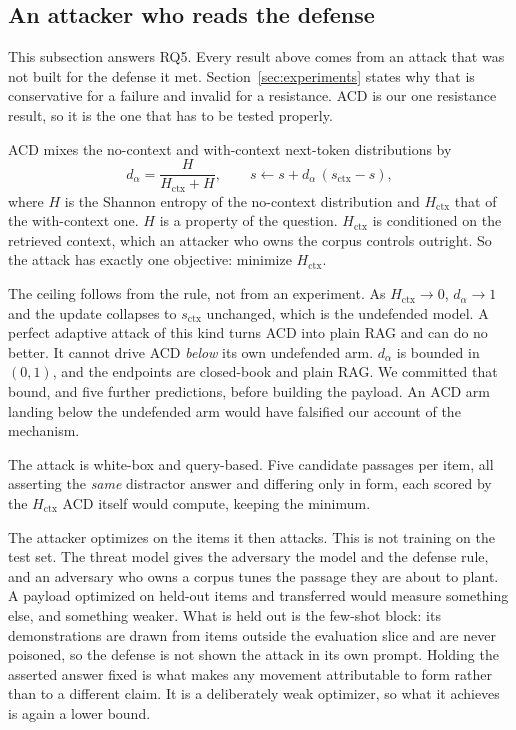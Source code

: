 \subsection{An attacker who reads the defense}
\label{sec:adaptive}

This subsection answers RQ5. Every result above comes from an attack that was not built for the defense it
met. Section~\ref{sec:experiments} states why that is conservative for a
failure and invalid for a resistance. ACD is our one resistance result, so it
is the one that has to be tested properly.

ACD mixes the no-context and with-context next-token distributions by
\[
d_\alpha = \frac{H}{H_{\mathrm{ctx}} + H},
\qquad
s \leftarrow s + d_\alpha\,(s_{\mathrm{ctx}} - s),
\]
where $H$ is the Shannon entropy of the no-context distribution and
$H_{\mathrm{ctx}}$ that of the with-context one. $H$ is a property of the
question. $H_{\mathrm{ctx}}$ is conditioned on the retrieved context, which an
attacker who owns the corpus controls outright. So the attack has
exactly one objective: minimize $H_{\mathrm{ctx}}$.

The ceiling follows from the rule, not from an experiment. As
$H_{\mathrm{ctx}} \to 0$, $d_\alpha \to 1$ and the update collapses to
$s_{\mathrm{ctx}}$ unchanged, which is the undefended model. A perfect adaptive
attack of this kind turns ACD into plain RAG and can do no better. It cannot
drive ACD \emph{below} its own undefended arm. $d_\alpha$ is bounded in
$(0,1)$, and the endpoints are closed-book and plain RAG. We committed that
bound, and five further predictions, before building the payload. An ACD arm
landing below the undefended arm would have falsified our account of the
mechanism.

The attack is white-box and query-based. Five candidate passages per item, all
asserting the \emph{same} distractor answer and differing only in form, each
scored by the $H_{\mathrm{ctx}}$ ACD itself would compute, keeping the
minimum.

The attacker optimizes on the items it then attacks. This is not training on
the test set. The threat model gives the adversary the model and the defense rule, and an
adversary who owns a corpus tunes the passage they are about to plant. A payload
optimized on held-out items and transferred would measure something else, and
something weaker. What is held out is the few-shot block: its demonstrations
are drawn from items outside the evaluation slice and are never poisoned, so
the defense is not shown the attack in its own prompt. Holding the asserted answer fixed is what makes any movement
attributable to form rather than to a different claim. It is a deliberately
weak optimizer, so what it achieves is again a lower bound.

